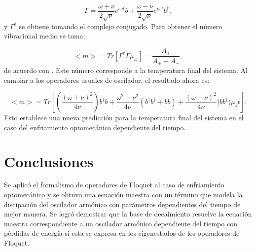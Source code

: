 \documentclass[a4paper,10pt]{report}
\begin{document}
\begin{equation}
\Gamma = \frac{\omega+\nu}{2\sqrt{\nu}}e^{i\omega t}b+\frac{\omega-\nu}{2\sqrt{\nu}}e^{i\omega t}b^\dagger,
\end{equation} y $\Gamma^\dagger$ se obtiene tomando el complejo conjugado. Para obtener el número vibracional medio se toma:

\begin{equation}
<m> = Tr[\Gamma^\dagger \Gamma \mu_{st}] = \frac{A_+}{A_+ - A_-},
\end{equation} de acuerdo con \cite{BarberisLC}. Este número corresponde a la temperatura final del sistema. Al cambiar a los operadores usuales de oscilador, el resultado ahora es:

\begin{equation}
<m> = Tr[(\frac{(\omega + \nu )^2}{4\nu})b^\dagger b +\frac{\omega^2 - \nu^2}{4\nu}(b^\dagger b^\dagger +bb) +\frac{(\omega - \nu )^2}{4\nu}) b b^\dagger)\mu_st].
\end{equation} Esto establece una nueva predicción para la temperatura final del sistema en el caso del enfriamiento optomecánico dependiente del tiempo.


\chapter{Conclusiones}

Se aplicó el formalismo de operadores de Floquet al caso de enfriamiento optomecánico y se obtuvo una ecuación maestra con un término que modela la discipación del oscilador armónico con parámetros dependientes del tiempo de mejor manera.  Se logró demostrar que la base de decaimiento resuelve la ecuación maestra correspondiente a un oscilador armónico dependiente del tiempo con pérdidas de energía si esta se expresa en los eigenestados de los operadores de Floquet.
\end{document}
